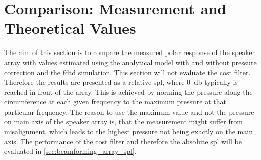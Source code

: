 \section{Comparison: Measurement and Theoretical Values}\label{sec:meas_vs_theory}

The aim of this section is to compare the measured polar response of the speaker array with values estimated using the analytical model with and without pressure correction and the \gls{fdtd} simulation. This section will not evaluate the cost filter. Therefore the results are presented as a relative \gls{spl}, where \SI{0}{\decibel} typically is reached in front of the array. This is achieved by norming the pressure along the circumference at each given frequency to the maximum pressure at that particular frequency. 
The reason to use the maximum value and not the pressure on main axis of the speaker array is, that the measurement might suffer from misalignment, which leads to the highest pressure not being exactly on the main axis. 
The performance of the cost filter and therefore the absolute \gls{spl} will be evaluated in \autoref{sec:beamforming_array_spl}.\\

